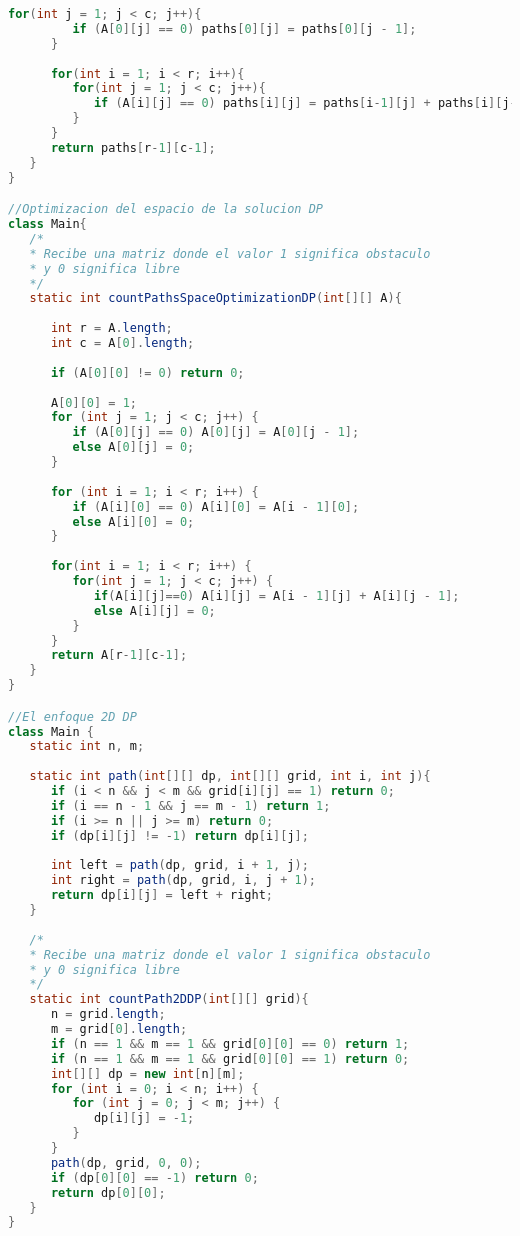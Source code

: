 \begin{lstlisting}[language=Java]
      for(int j = 1; j < c; j++){
         if (A[0][j] == 0) paths[0][j] = paths[0][j - 1];
      }
		
      for(int i = 1; i < r; i++){
         for(int j = 1; j < c; j++){
            if (A[i][j] == 0) paths[i][j] = paths[i-1][j] + paths[i][j-1];
         }
      }
      return paths[r-1][c-1];
   }
}

//Optimizacion del espacio de la solucion DP
class Main{
   /*
   * Recibe una matriz donde el valor 1 significa obstaculo
   * y 0 significa libre
   */	
   static int countPathsSpaceOptimizationDP(int[][] A){
		
      int r = A.length;
      int c = A[0].length;
		
      if (A[0][0] != 0) return 0;
      
      A[0][0] = 1;
      for (int j = 1; j < c; j++) {
         if (A[0][j] == 0) A[0][j] = A[0][j - 1];
         else A[0][j] = 0;
      }
      
      for (int i = 1; i < r; i++) {
         if (A[i][0] == 0) A[i][0] = A[i - 1][0];
	     else A[i][0] = 0;
      }
		
      for(int i = 1; i < r; i++) {
         for(int j = 1; j < c; j++) {
            if(A[i][j]==0) A[i][j] = A[i - 1][j] + A[i][j - 1];
            else A[i][j] = 0;
         }
      }
      return A[r-1][c-1];
   }
}

//El enfoque 2D DP
class Main {
   static int n, m;
	
   static int path(int[][] dp, int[][] grid, int i, int j){
      if (i < n && j < m && grid[i][j] == 1) return 0;
      if (i == n - 1 && j == m - 1) return 1;
      if (i >= n || j >= m) return 0;
      if (dp[i][j] != -1) return dp[i][j];
      
      int left = path(dp, grid, i + 1, j);
      int right = path(dp, grid, i, j + 1);
      return dp[i][j] = left + right;
   }
   
   /*
   * Recibe una matriz donde el valor 1 significa obstaculo
   * y 0 significa libre
   */	
   static int countPath2DDP(int[][] grid){
      n = grid.length;
      m = grid[0].length;
      if (n == 1 && m == 1 && grid[0][0] == 0) return 1;
      if (n == 1 && m == 1 && grid[0][0] == 1) return 0;
      int[][] dp = new int[n][m];
      for (int i = 0; i < n; i++) {
         for (int j = 0; j < m; j++) {
            dp[i][j] = -1;
         }
      }
      path(dp, grid, 0, 0);
      if (dp[0][0] == -1) return 0;
      return dp[0][0];
   }
}
\end{lstlisting}